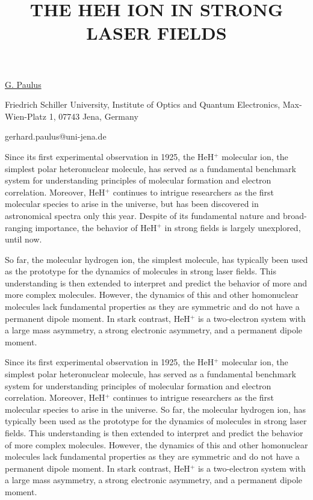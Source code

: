 \title{THE HEH ION IN STRONG LASER FIELDS}

\underline{G. Paulus}  

{\normalsize{\vspace{-4mm}
Friedrich Schiller University,
Institute of Optics and Quantum Electronics,
Max-Wien-Platz 1,
07743 Jena,
Germany



\email gerhard.paulus@uni-jena.de}}

Since its first experimental observation in 1925, the HeH$^+$ molecular ion, the simplest polar heteronuclear molecule, has served as a fundamental benchmark system for understanding principles of molecular formation and electron correlation. Moreover, HeH$^+$ continues to intrigue researchers as the first molecular species to arise in the universe, but has been discovered in astronomical spectra only this year. Despite of its fundamental nature and broad-ranging importance, the behavior of HeH$^+$ in strong fields is largely unexplored, until now.

So far, the molecular hydrogen ion, the simplest molecule, has typically been used as the prototype for the dynamics of molecules in strong laser fields. This understanding is then extended to interpret and predict the behavior of more and more complex molecules. However, the dynamics of this and other homonuclear molecules lack fundamental properties as they are symmetric and do not have a permanent dipole moment. In stark contrast, HeH$^+$ is a two-electron system with a large mass asymmetry, a strong electronic asymmetry, and a permanent dipole moment.

Since its first experimental observation in 1925, the HeH$^+$ molecular ion, the simplest polar heteronuclear molecule, has served as a fundamental benchmark system for understanding principles of molecular formation and electron correlation. Moreover, HeH$^+$ continues to intrigue researchers as the first molecular species to arise in the universe.
So far, the molecular hydrogen ion, has typically been used as the prototype for the dynamics of molecules in strong laser fields. This understanding is then extended to interpret and predict the behavior of more complex molecules. However, the dynamics of this and other homonuclear molecules lack fundamental properties as they are symmetric and do not have a permanent dipole moment. In stark contrast, HeH$^+$ is a two-electron system with a large mass asymmetry, a strong electronic asymmetry, and a permanent dipole moment.

